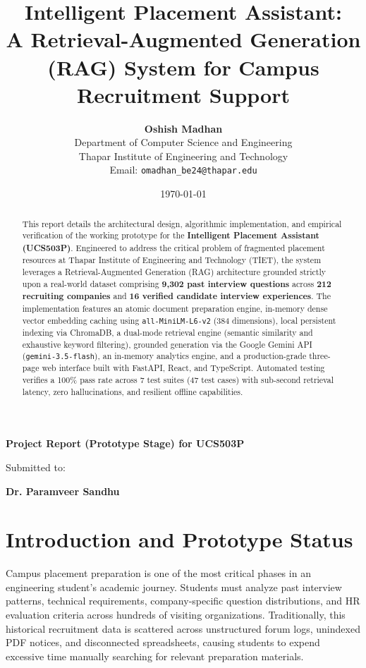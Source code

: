 \documentclass[11pt]{article}
\title{\textbf{Intelligent Placement Assistant: \\ A Retrieval-Augmented Generation (RAG) System for Campus Recruitment Support}}
\author{
\textbf{Oshish Madhan}\\
Department of Computer Science and Engineering\\
Thapar Institute of Engineering and Technology\\
Email: \texttt{omadhan\_be24@thapar.edu}
}
\date{\today}
\begin{document}
\maketitle

\begin{center}
\textbf{Project Report (Prototype Stage) for UCS503P}

\vspace{0.2cm}

Submitted to:

\textbf{Dr. Paramveer Sandhu}
\end{center}

\vspace{0.5cm}

\begin{abstract}
This report details the architectural design, algorithmic implementation, and empirical verification of the working prototype for the \textbf{Intelligent Placement Assistant (UCS503P)}. Engineered to address the critical problem of fragmented placement resources at Thapar Institute of Engineering and Technology (TIET), the system leverages a Retrieval-Augmented Generation (RAG) architecture grounded strictly upon a real-world dataset comprising \textbf{9,302 past interview questions} across \textbf{212 recruiting companies} and \textbf{16 verified candidate interview experiences}. The implementation features an atomic document preparation engine, in-memory dense vector embedding caching using \texttt{all-MiniLM-L6-v2} (384 dimensions), local persistent indexing via ChromaDB, a dual-mode retrieval engine (semantic similarity and exhaustive keyword filtering), grounded generation via the Google Gemini API (\texttt{gemini-3.5-flash}), an in-memory analytics engine, and a production-grade three-page web interface built with FastAPI, React, and TypeScript. Automated testing verifies a 100\% pass rate across 7 test suites (47 test cases) with sub-second retrieval latency, zero hallucinations, and resilient offline capabilities.
\end{abstract}

\vspace{0.5cm}

\section{Introduction and Prototype Status}

Campus placement preparation is one of the most critical phases in an engineering student's academic journey. Students must analyze past interview patterns, technical requirements, company-specific question distributions, and HR evaluation criteria across hundreds of visiting organizations. Traditionally, this historical recruitment data is scattered across unstructured forum logs, unindexed PDF notices, and disconnected spreadsheets, causing students to expend excessive time manually searching for relevant preparation materials.
\end{document}
